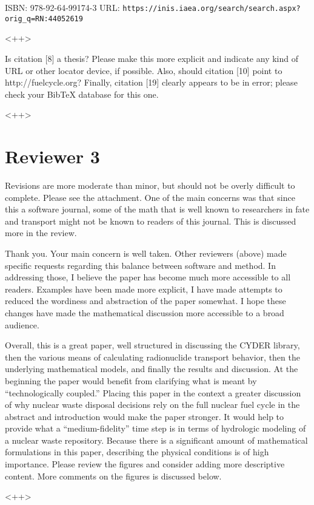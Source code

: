 \documentclass[answers,12pt]{exam}
\begin{document}
\begin{questions}
ISBN: 978-92-64-99174-3
URL: \verb|https://inis.iaea.org/search/search.aspx?orig_q=RN:44052619|
\begin{solution}
<++>
\end{solution}

\question Is citation [8] a thesis? Please make this more explicit and indicate any kind of URL or other locator device, if possible. Also, should citation [10] point to http://fuelcycle.org? Finally, citation [19] clearly appears to be in error; please check your BibTeX database for this one.
\begin{solution}
<++>
\end{solution}

\section*{Reviewer 3}

\question   Revisions are more moderate than minor, but should not be overly difficult
to complete. Please see the attachment. One of the main concerns was that since
this a software journal, some of the math that is well known to researchers in
fate and transport might not be known to readers of this journal. This is
discussed more in the review.
\begin{solution}
Thank you. Your main concern is well taken. Other reviewers (above) made 
        specific requests regarding this balance between software and method. 
        In addressing those, I believe the paper has become much more 
        accessible to all readers. Examples have been made more explicit, I 
        have made attempts to reduced the wordiness and abstraction of the 
        paper somewhat. I hope these changes have made the mathematical 
        discussion more accessible to a broad audience. 
\end{solution}

\question
Overall,  this  is  a  great  paper,  well  structured  in  discussing  the  CYDER  library,  then  the  various  means  of 
calculating  radionuclide  transport  behavior,  then  the  underlying  mathematical  models,  and  finally  the  results 
and  discussion.  At  the  beginning  the  paper  would  benefit  from  
clarifying  what  is  meant  by  ``technologically 
coupled.''  Placing  this  paper  in  the  context  a  greater  discussion  of  why  nuclear  waste  disposal  decisions  rely 
on  the  full  nuclear  fuel  cycle  in  the  abstract  and  introduction  would  make  the  paper stronger.  It would help 
to  provide  what  a  ``medium-fidelity''  time  step  is  in  terms  of  hydrologic  modeling  of  a  nuclear  waste 
repository.  Because  there  is  a  significant  amount  of  mathematical  formulations  in  this  paper,  describing  the 
physical  conditions  is  of  high  importance.  Please  review  the  figures  and  consider  adding  more  descriptive 
content. More comments on the figures is discussed below.  
\begin{solution}
<++>
\end{solution} 


\end{questions}
\end{document}
